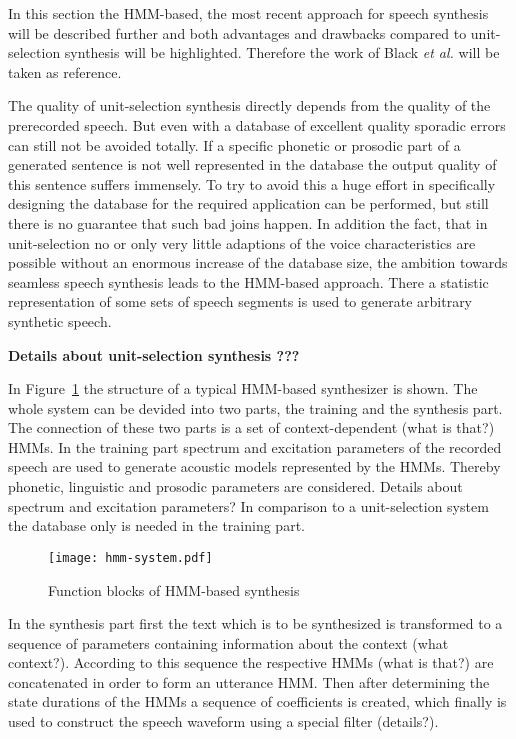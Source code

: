 In this section the \ac{HMM}-based, the most recent approach for speech synthesis will be described further and both advantages and drawbacks compared to unit-selection synthesis will be highlighted. Therefore the work of Black \textit{et al.} \cite{black:statistical} will be taken as reference.

The quality of unit-selection synthesis directly depends from the quality of the prerecorded speech. But even with a database of excellent quality sporadic errors can still not be avoided totally. If a specific phonetic or prosodic part of a generated sentence is not well represented in the database the output quality of this sentence suffers immensely. To try to avoid this a huge effort in specifically designing the database for the required application can be performed, but still there is no guarantee that such bad joins happen. In addition the fact, that in unit-selection no or only very little adaptions of the voice characteristics are possible without an enormous increase of the database size, the ambition towards seamless speech synthesis leads to the \ac{HMM}-based approach. There a statistic representation of some sets of speech segments is used to generate arbitrary synthetic speech.

\textbf{{\color{ACMRed}Details about unit-selection synthesis ???}}

In Figure~\ref{fig:hmm} the structure of a typical \ac{HMM}-based synthesizer is shown. The whole system can be devided into two parts, the training and the synthesis part. The connection of these two parts is a set of context-dependent ({\color{ACMRed}what is that?}) \acp{HMM}. In the training part spectrum and excitation parameters of the recorded speech are used to generate acoustic models represented by the \acp{HMM}. Thereby phonetic, linguistic and prosodic parameters are considered. {\color{ACMRed}Details about spectrum and excitation parameters?} In comparison to a unit-selection system the database only is needed in the training part.

\begin{figure}[h]
	\texttt{[image: hmm-system.pdf]}
	\caption{Function blocks of \ac{HMM}-based synthesis \cite{black:statistical}}
	\label{fig:hmm}
\end{figure}

In the synthesis part first the text which is to be synthesized is transformed to a sequence of parameters containing information about the context ({\color{ACMRed}what context?}). According to this sequence the respective \acp{HMM} ({\color{ACMRed}what is that?}) are concatenated in order to form an utterance \ac{HMM}. Then after determining the state durations of the \acp{HMM} a sequence of coefficients is created, which finally is used to construct the speech waveform using a special filter ({\color{ACMRed}details?}).

